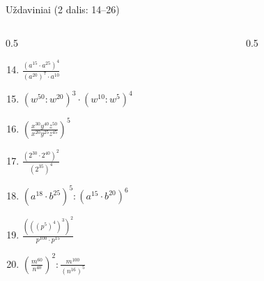 \documentclass[aspectratio=169,10pt]{beamer}
\begin{document}
\begin{frame}{Uždaviniai (2 dalis: 14--26)}

    \begin{columns}[T]

        \begin{column}{0.5\textwidth}

            \begin{enumerate}

                \setcounter{enumi}{13}

                \item
                $\frac{
                (a^{15}\cdot a^{25})^4
                }{
                (a^{20})^7\cdot a^{10}
                }$

                \item
                $(w^{50}:w^{20})^3
                \cdot
                (w^{10}:w^5)^4$

                \item
                $\left(
                \frac{
                x^{30}y^{40}z^{50}
                }{
                x^{20}y^{25}z^{45}
                }
                \right)^5$

                \item
                $\frac{
                (2^{30}\cdot2^{40})^2
                }{
                (2^{35})^4
                }$

                \item
                $(a^{18}\cdot b^{25})^5:
                (a^{15}\cdot b^{20})^6$

                \item
                $\frac{
                (((p^5)^4)^3)^2
                }{
                p^{100}\cdot p^{15}
                }$

                \item
                $\left(
                \frac{m^{60}}{n^{40}}
                \right)^2
                :
                \frac{
                m^{100}
                }{
                (n^{16})^5
                }$

            \end{enumerate}

        \end{column}

        \begin{column}{0.5\textwidth}


\end{column}
\end{columns}
\end{frame}
\end{document}
